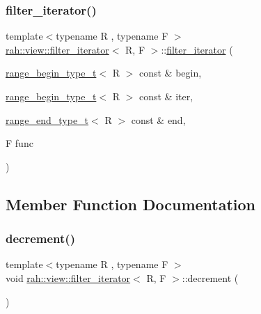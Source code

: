 \mbox{\label{structrah_1_1view_1_1filter__iterator_a31543c024a816c4f3e8fc8937b2a9214}} 
\subsubsection{\texorpdfstring{filter\_iterator()}{filter\_iterator()}\hspace{0.1cm}{\footnotesize\ttfamily [2/2]}}
{\footnotesize\ttfamily template$<$typename R , typename F $>$ \\
\mbox{\hyperlink{structrah_1_1view_1_1filter__iterator}{rah\+::view\+::filter\+\_\+iterator}}$<$ R, F $>$\+::\mbox{\hyperlink{structrah_1_1view_1_1filter__iterator}{filter\+\_\+iterator}} (\begin{DoxyParamCaption}\item[{\mbox{\hyperlink{namespacerah_a28aff4eeddcece6be65ff0b956d32d4a}{range\+\_\+begin\+\_\+type\+\_\+t}}$<$ R $>$ const \&}]{begin,  }\item[{\mbox{\hyperlink{namespacerah_a28aff4eeddcece6be65ff0b956d32d4a}{range\+\_\+begin\+\_\+type\+\_\+t}}$<$ R $>$ const \&}]{iter,  }\item[{\mbox{\hyperlink{namespacerah_a9657e24ae477f4482225b133fe286b65}{range\+\_\+end\+\_\+type\+\_\+t}}$<$ R $>$ const \&}]{end,  }\item[{F}]{func }\end{DoxyParamCaption})\hspace{0.3cm}{\ttfamily [inline]}}



\subsection{Member Function Documentation}
\mbox{\label{structrah_1_1view_1_1filter__iterator_aed445498ffbec0c3e782ddc17314b677}} 
\subsubsection{\texorpdfstring{decrement()}{decrement()}\hspace{0.1cm}{\footnotesize\ttfamily [1/2]}}
{\footnotesize\ttfamily template$<$typename R , typename F $>$ \\
void \mbox{\hyperlink{structrah_1_1view_1_1filter__iterator}{rah\+::view\+::filter\+\_\+iterator}}$<$ R, F $>$\+::decrement (\begin{DoxyParamCaption}{ }\end{DoxyParamCaption})\hspace{0.3cm}{\ttfamily [inline]}}

